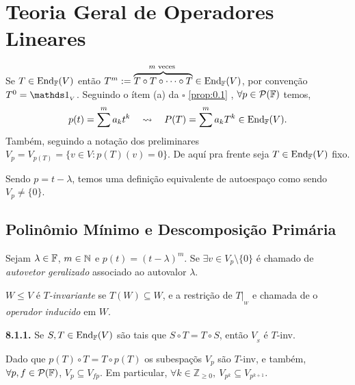 \section{Teoria Geral de Operadores Lineares}

\vspace{-0.3cm}
Se \(T\in \operatorname{End}_{\mathbb{F}}(V)\) então \(T^m := \overbrace{T\circ T \circ \cdots \circ T}^{m\text{ veces }} \in \operatorname{End}_{\mathbb{F}}(V)\), por convenção \(T^0 = \id_{_V}\). Seguindo o ítem (a) da \(\square \) \ref{prop:0.1} , \(\forall p \in \mathcal{P}(\mathbb{F})\) temos,  
\[p(t) = \sum^m a_kt^k \ \ \ \leadsto \ \ \ P(T) = \sum^m a_kT^k \in \operatorname{End}_{\mathbb{F}}(V).\] 
Também, seguindo a notação dos preliminares \( V_{p}= V_{{p(T)}} = \{v\in V: p(T)(v) = 0\}\). De aquí pra frente seja \(T\in \operatorname{End}_{\mathbb{F}}(V)\) fixo. 

\begin{note}
    Sendo \(p = t-\lambda\), temos uma definição equivalente de autoespaço como sendo \(V_p \neq \{0\}\). 
\end{note}

\subsection{Polinômio Mínimo e Descomposição Primária}

\begin{definition}
    Sejam \(\lambda \in \mathbb{F}\), \(m\in \mathbb{N}\) e \(p(t) = (t-\lambda)^m\). Se \(\exists v\in V_p\setminus \{0\}\) é chamado de \emph{autovetor geralizado} associado ao autovalor \(\lambda\).  
\end{definition}

\begin{definition}
    \(W\leq V\) é \emph{\(T\)-invariante} se \(T(W) \subseteq W\), e a restrição de \(T|_{_W}\) e chamada de o \emph{operador inducido} em \(W\). 
\end{definition}

\begin{lemma}
    \textbf{8.1.1.} Se \(S, T \in \operatorname{End}_{\mathbb{F}}(V)\) são tais que \(S\circ T = T \circ S\), então \(V_{_S}\) é \(T\)-inv. %
\end{lemma}

\begin{note}
    Dado que \(p(T) \circ T = T\circ p(T)\) os subespaçõs \(V_p \) são \(T\)-inv, e também, \(\forall p, f \in \mathcal{P}(\mathbb{F}) \), \(V_p \subseteq V_{fp}\). Em particular, \(\forall k \in \mathbb{Z}_{\geq 0}, \ V_{p^k} \subseteq V_{p^{k+1}}\). 
\end{note}

